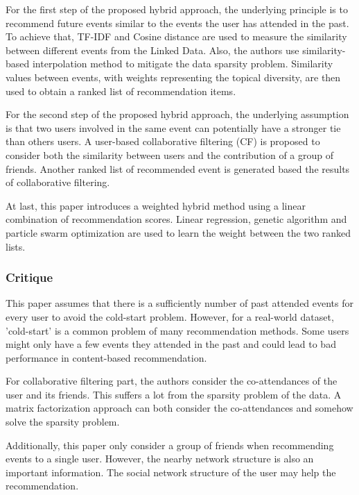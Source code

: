 \documentclass{article}
\begin{document}
For the first step of the proposed hybrid approach, the underlying principle is to recommend future events similar to the events the user has attended in the past. To achieve that, TF-IDF and Cosine distance are used to measure the similarity between different events from the Linked Data. Also, the authors use similarity-based interpolation method to mitigate the data sparsity problem. Similarity values between events, with weights representing the topical diversity, are then used to obtain a ranked list of recommendation items.

For the second step of the proposed hybrid approach, the underlying assumption is that  two users involved in the same event can potentially have a stronger tie than others users. A user-based collaborative filtering (CF) is proposed to consider both the similarity between users and the contribution of a group of friends. Another ranked list of recommended event is generated based the results of collaborative filtering.
	
At last, this paper introduces a weighted hybrid method using a linear combination of recommendation scores. Linear regression, genetic algorithm and particle swarm optimization are used to learn the weight between the two ranked lists.

\subsubsection{Critique}
This paper assumes that there is a sufficiently number of past attended events for every user to avoid the cold-start problem. However, for a real-world dataset, 'cold-start' is a common problem of many recommendation methods. Some users might only have a few events they attended in the past and could lead to bad performance in content-based recommendation. 

For collaborative filtering part, the authors consider the co-attendances of the user and its friends. This suffers a lot from the sparsity problem of the data. A matrix factorization approach can both consider the co-attendances and somehow solve the sparsity problem. 

Additionally, this paper only consider a group of friends when recommending events to a single user. However, the nearby network structure is also an important information. The social network structure of the user may help the recommendation.
\end{document}
